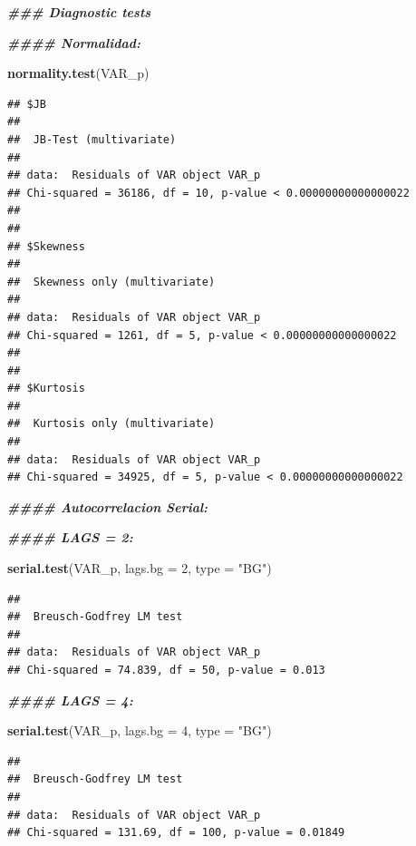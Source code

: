 \documentclass[
]{book}
\newenvironment{Shaded}{\begin{snugshade}}{\end{snugshade}}
\newcommand{\AttributeTok}[1]{\textcolor[rgb]{0.13,0.29,0.53}{#1}}
\newcommand{\DecValTok}[1]{\textcolor[rgb]{0.00,0.00,0.81}{#1}}
\newcommand{\DocumentationTok}[1]{\textcolor[rgb]{0.56,0.35,0.01}{\textbf{\textit{#1}}}}
\newcommand{\FunctionTok}[1]{\textcolor[rgb]{0.13,0.29,0.53}{\textbf{#1}}}
\newcommand{\NormalTok}[1]{#1}
\newcommand{\StringTok}[1]{\textcolor[rgb]{0.31,0.60,0.02}{#1}}
\begin{document}
\begin{Shaded}
\begin{Highlighting}[]
\DocumentationTok{\#\#\# Diagnostic tests}

\DocumentationTok{\#\#\#\# Normalidad:}

\FunctionTok{normality.test}\NormalTok{(VAR\_p)}
\end{Highlighting}
\end{Shaded}

\begin{verbatim}
## $JB
## 
##  JB-Test (multivariate)
## 
## data:  Residuals of VAR object VAR_p
## Chi-squared = 36186, df = 10, p-value < 0.00000000000000022
## 
## 
## $Skewness
## 
##  Skewness only (multivariate)
## 
## data:  Residuals of VAR object VAR_p
## Chi-squared = 1261, df = 5, p-value < 0.00000000000000022
## 
## 
## $Kurtosis
## 
##  Kurtosis only (multivariate)
## 
## data:  Residuals of VAR object VAR_p
## Chi-squared = 34925, df = 5, p-value < 0.00000000000000022
\end{verbatim}

\begin{Shaded}
\begin{Highlighting}[]
\DocumentationTok{\#\#\#\# Autocorrelacion Serial:}

\DocumentationTok{\#\#\#\# LAGS = 2:}

\FunctionTok{serial.test}\NormalTok{(VAR\_p, }\AttributeTok{lags.bg =} \DecValTok{2}\NormalTok{, }\AttributeTok{type =} \StringTok{"BG"}\NormalTok{)}
\end{Highlighting}
\end{Shaded}

\begin{verbatim}
## 
##  Breusch-Godfrey LM test
## 
## data:  Residuals of VAR object VAR_p
## Chi-squared = 74.839, df = 50, p-value = 0.013
\end{verbatim}

\begin{Shaded}
\begin{Highlighting}[]
\DocumentationTok{\#\#\#\# LAGS = 4:}

\FunctionTok{serial.test}\NormalTok{(VAR\_p, }\AttributeTok{lags.bg =} \DecValTok{4}\NormalTok{, }\AttributeTok{type =} \StringTok{"BG"}\NormalTok{)}
\end{Highlighting}
\end{Shaded}

\begin{verbatim}
## 
##  Breusch-Godfrey LM test
## 
## data:  Residuals of VAR object VAR_p
## Chi-squared = 131.69, df = 100, p-value = 0.01849
\end{verbatim}
\end{document}
